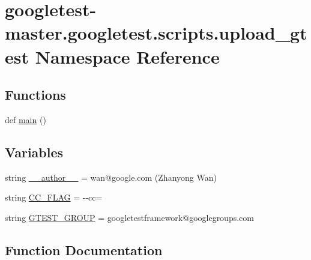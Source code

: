 \hypertarget{namespacegoogletest-master_1_1googletest_1_1scripts_1_1upload__gtest}{}\section{googletest-\/master.googletest.\+scripts.\+upload\+\_\+gtest Namespace Reference}
\label{namespacegoogletest-master_1_1googletest_1_1scripts_1_1upload__gtest}
\subsection*{Functions}
\begin{DoxyCompactItemize}
\item 
def \mbox{\hyperlink{namespacegoogletest-master_1_1googletest_1_1scripts_1_1upload__gtest_aece095cb325f9b6c2eb082189fd56c2f}{main}} ()
\end{DoxyCompactItemize}
\subsection*{Variables}
\begin{DoxyCompactItemize}
\item 
string \mbox{\hyperlink{namespacegoogletest-master_1_1googletest_1_1scripts_1_1upload__gtest_a9d28a3b087688524dc86d22fb9dd297f}{\+\_\+\+\_\+author\+\_\+\+\_\+}} = \textquotesingle{}wan@google.\+com (Zhanyong Wan)\textquotesingle{}
\item 
string \mbox{\hyperlink{namespacegoogletest-master_1_1googletest_1_1scripts_1_1upload__gtest_a3cff3ae0b523d362aba4277f1473f6dd}{C\+C\+\_\+\+F\+L\+AG}} = \textquotesingle{}-\/-\/cc=\textquotesingle{}
\item 
string \mbox{\hyperlink{namespacegoogletest-master_1_1googletest_1_1scripts_1_1upload__gtest_ad6fecd1b08bb0ffd3bb397046091ae7b}{G\+T\+E\+S\+T\+\_\+\+G\+R\+O\+UP}} = \textquotesingle{}googletestframework@googlegroups.\+com\textquotesingle{}
\end{DoxyCompactItemize}


\subsection{Function Documentation}
\mbox{\label{namespacegoogletest-master_1_1googletest_1_1scripts_1_1upload__gtest_aece095cb325f9b6c2eb082189fd56c2f}} 
